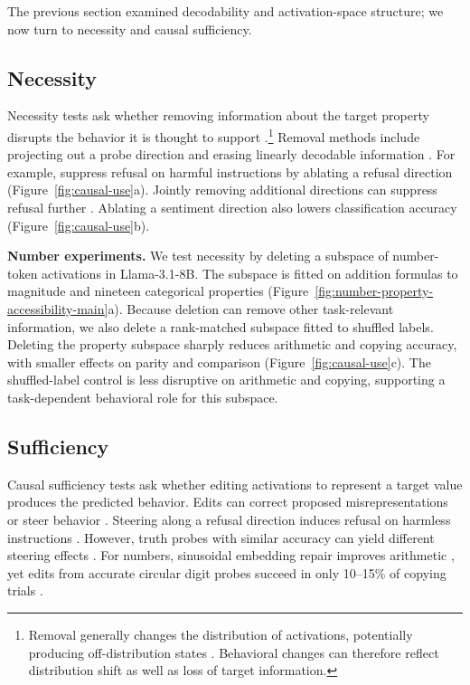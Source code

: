 \documentclass[11pt]{article}
\begin{document}
The previous section examined decodability and activation-space structure; we now turn to necessity and causal sufficiency.

\subsection{Necessity}
\label{sec:necessity}

Necessity tests ask whether removing information about the target property disrupts the behavior it is thought to support \citep[Sec.~3.2]{harding2023operationalising}.\footnote{
Removal generally changes the distribution of activations, potentially producing off-distribution states \citep[Appendix~A]{mcgrath2023hydra}.
Behavioral changes can therefore reflect distribution shift as well as loss of target information.}
Removal methods include projecting out a probe direction and erasing linearly decodable information \citep{ravfogel2020null,belrose2023leace}.
For example, \citet{arditi2024refusal} suppress refusal on harmful instructions by ablating a refusal direction (Figure~\ref{fig:causal-use}a).
Jointly removing additional directions can suppress refusal further \citep{wollschlager2025geometry}.
Ablating a sentiment direction also lowers classification accuracy \citep{tigges2023linear} (Figure~\ref{fig:causal-use}b).

\textbf{Number experiments.} We test necessity by deleting a subspace of number-token activations in Llama-3.1-8B.
The subspace is fitted on addition formulas to magnitude and nineteen categorical properties (Figure~\ref{fig:number-property-accessibility-main}a).
Because deletion can remove other task-relevant information, we also delete a rank-matched subspace fitted to shuffled labels.
Deleting the property subspace sharply reduces arithmetic and copying accuracy, with smaller effects on parity and comparison (Figure~\ref{fig:causal-use}c).
The shuffled-label control is less disruptive on arithmetic and copying, supporting a task-dependent behavioral role for this subspace.

\subsection{Sufficiency}
\label{sec:sufficiency}

Causal sufficiency tests ask whether editing activations to represent a target value produces the predicted behavior.
Edits can correct proposed misrepresentations \citep[Sec.~3.3]{harding2023operationalising} or steer behavior \citep{li2023iti,tigges2023linear,zou2023representation}.
Steering along a refusal direction induces refusal on harmless instructions \citep{arditi2024refusal}.
However, truth probes with similar accuracy can yield different steering effects \citep{marks2024geometry}.
For numbers, sinusoidal embedding repair improves arithmetic \citep{kadlcik2025accurate}, yet edits from accurate circular digit probes succeed in only 10--15\% of copying trials \citep{levy2025base10}.
\end{document}
